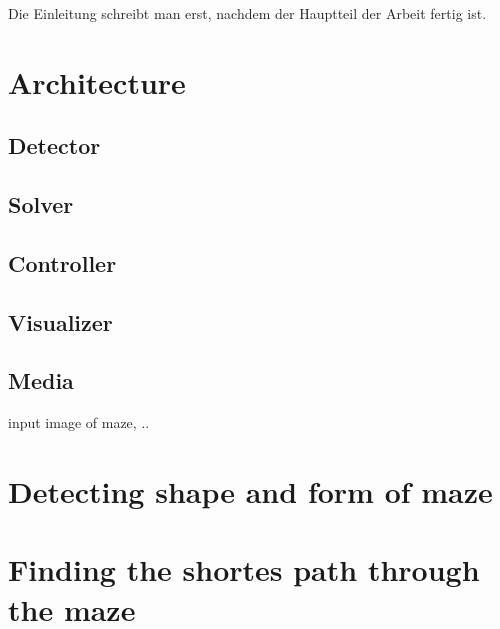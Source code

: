 \documentclass[conference,compsoc,final,a4paper]{IEEEtran}
\begin{document}
Die Einleitung schreibt man erst, nachdem der Hauptteil der Arbeit fertig ist.

\section{Architecture}\label{architecture}


\subsection{Detector}

\subsection{Solver}

\subsection{Controller}

\subsection{Visualizer}

\subsection{Media}
input image of maze, ..


\section{Detecting shape and form of maze}\label{detection}

\subsection{}

\section{Finding the shortes path through the maze}\label{solving}

\subsection{}
\end{document}
